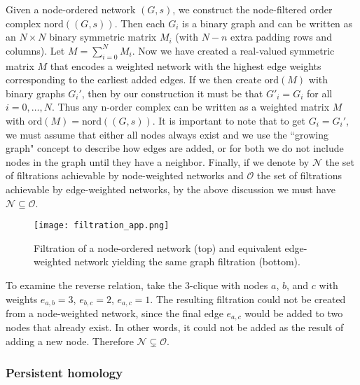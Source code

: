 \documentclass{article}
\begin{document}
Given a node-ordered network $(G,s)$, we construct the node-filtered order complex $\text{nord}((G,s))$. Then each $G_i$ is a binary graph and can be written as an $N \times N$ binary symmetric matrix $M_i$ (with $N-n$ extra padding rows and columns). Let $M = \sum_{i=0}^N M_i$. Now we have created a real-valued symmetric matrix $M$ that encodes a weighted network with the highest edge weights corresponding to the earliest added edges. If we then create $\text{ord}(M)$ with binary graphs $G_i'$, then by our construction it must be that $G'_i = G_i$ for all $i = 0, \dots, N$. Thus any n-order complex can be written as a weighted matrix $M$ with $\text{ord}(M) = \text{nord}((G,s))$. It is important to note that to get $G_i = G_i'$, we must assume that either all nodes always exist and we use the ``growing graph" concept to describe how edges are added, or for both we do not include nodes in the graph until they have a neighbor. Finally, if we denote by $\mathcal{N}$ the set of filtrations achievable by node-weighted networks and $\mathcal{O}$ the set of filtrations achievable by edge-weighted networks, by the above discussion we must have $\mathcal{N} \subseteq \mathcal{O}$.

\begin{figure}[h!]
	\centering
	\texttt{[image: filtration\_app.png]}
	\caption{Filtration of a node-ordered network (top) and equivalent edge-weighted network yielding the same graph filtration (bottom).}
	\label{fig:sfig_filts}
	
\end{figure}

To examine the reverse relation, take the $3$-clique with nodes $a$, $b$, and $c$ with weights $e_{a,b} = 3$, $e_{b,c} = 2$, $e_{a,c} = 1$. The resulting filtration could not be created from a node-weighted network, since the final edge $e_{a,c}$ would be added to two nodes that already exist. In other words, it could not be added as the result of adding a new node. Therefore $\mathcal{N} \subsetneq \mathcal{O}$.


\subsubsection*{Persistent homology}
\end{document}
